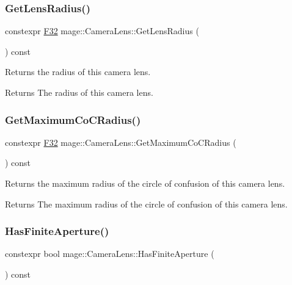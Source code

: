 \subsubsection{\texorpdfstring{Get\+Lens\+Radius()}{GetLensRadius()}}
{\footnotesize\ttfamily constexpr \hyperlink{namespacemage_aa97e833b45f06d60a0a9c4fc22ae02c0}{F32} mage\+::\+Camera\+Lens\+::\+Get\+Lens\+Radius (\begin{DoxyParamCaption}{ }\end{DoxyParamCaption}) const\hspace{0.3cm}{\ttfamily [noexcept]}}

Returns the radius of this camera lens.

\begin{DoxyReturn}{Returns}
The radius of this camera lens. 
\end{DoxyReturn}
\hypertarget{classmage_1_1_camera_lens_aba81adddf97b7630e36b3cfc1c04a2d4}{}\label{classmage_1_1_camera_lens_aba81adddf97b7630e36b3cfc1c04a2d4} 
\subsubsection{\texorpdfstring{Get\+Maximum\+Co\+C\+Radius()}{GetMaximumCoCRadius()}}
{\footnotesize\ttfamily constexpr \hyperlink{namespacemage_aa97e833b45f06d60a0a9c4fc22ae02c0}{F32} mage\+::\+Camera\+Lens\+::\+Get\+Maximum\+Co\+C\+Radius (\begin{DoxyParamCaption}{ }\end{DoxyParamCaption}) const\hspace{0.3cm}{\ttfamily [noexcept]}}

Returns the maximum radius of the circle of confusion of this camera lens.

\begin{DoxyReturn}{Returns}
The maximum radius of the circle of confusion of this camera lens. 
\end{DoxyReturn}
\hypertarget{classmage_1_1_camera_lens_ac9b2400bf5b2187e7348b259735e4c9e}{}\label{classmage_1_1_camera_lens_ac9b2400bf5b2187e7348b259735e4c9e} 
\subsubsection{\texorpdfstring{Has\+Finite\+Aperture()}{HasFiniteAperture()}}
{\footnotesize\ttfamily constexpr bool mage\+::\+Camera\+Lens\+::\+Has\+Finite\+Aperture (\begin{DoxyParamCaption}{ }\end{DoxyParamCaption}) const\hspace{0.3cm}{\ttfamily [noexcept]}}

